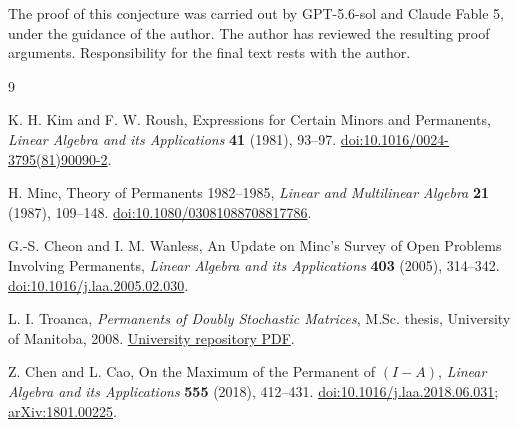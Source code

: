 \documentclass[11pt]{article}
\theoremstyle{remark}
\begin{document}
The proof of this conjecture was carried out by GPT-5.6-sol and Claude Fable
5, under the guidance of the author. The author has reviewed the resulting
proof arguments. Responsibility for the final text rests with the author.

\begin{thebibliography}{9}

K. H. Kim and F. W. Roush,
\newblock Expressions for Certain Minors and Permanents,
\newblock \emph{Linear Algebra and its Applications} \textbf{41} (1981), 93--97.
\newblock \href{https://doi.org/10.1016/0024-3795(81)90090-2}{doi:10.1016/0024-3795(81)90090-2}.

H. Minc,
\newblock Theory of Permanents 1982--1985,
\newblock \emph{Linear and Multilinear Algebra} \textbf{21} (1987), 109--148.
\newblock \href{https://doi.org/10.1080/03081088708817786}{doi:10.1080/03081088708817786}.

G.-S. Cheon and I. M. Wanless,
\newblock An Update on Minc's Survey of Open Problems Involving Permanents,
\newblock \emph{Linear Algebra and its Applications} \textbf{403} (2005), 314--342.
\newblock \href{https://doi.org/10.1016/j.laa.2005.02.030}{doi:10.1016/j.laa.2005.02.030}.

L. I. Troanca,
\newblock \emph{Permanents of Doubly Stochastic Matrices}, M.Sc. thesis,
University of Manitoba, 2008.
\newblock \href{https://mspace.lib.umanitoba.ca/bitstreams/5f1b99a6-487f-4308-91e8-0ff0c3b4e7b1/download}{University repository PDF}.

Z. Chen and L. Cao,
\newblock On the Maximum of the Permanent of $(I-A)$,
\newblock \emph{Linear Algebra and its Applications} \textbf{555} (2018), 412--431.
\newblock \href{https://doi.org/10.1016/j.laa.2018.06.031}{doi:10.1016/j.laa.2018.06.031};
\href{https://arxiv.org/abs/1801.00225}{arXiv:1801.00225}.

\end{thebibliography}
\end{document}
